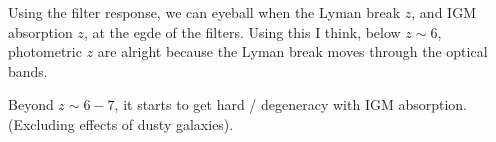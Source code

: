 Using the filter response, we can eyeball when the Lyman break $z$, and IGM absorption $z$, at the egde of the filters.  Using this I think, below $z \sim 6$, photometric $z$ are alright because the Lyman break moves through the optical bands.  

Beyond $z \sim 6-7$, it starts to get hard / degeneracy with IGM absorption. (Excluding effects of dusty galaxies).







